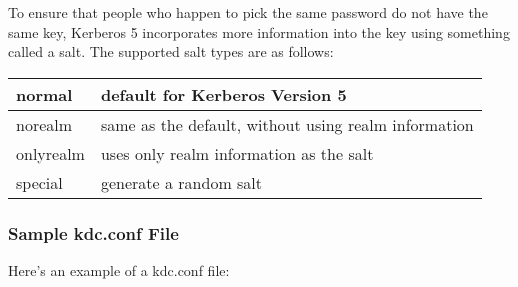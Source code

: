\documentclass[letterpaper,10pt,english]{sphinxmanual}
\begin{document}
To ensure that people who happen to pick the same password do not have
the same key, Kerberos 5 incorporates more information into the key
using something called a salt.  The supported salt types are as
follows:


\begin{savenotes}\sphinxattablestart
\centering
\begin{tabulary}{\linewidth}[t]{|T|T|}
\hline

normal
&
default for Kerberos Version 5
\\
\hline
norealm
&
same as the default, without using realm information
\\
\hline
onlyrealm
&
uses only realm information as the salt
\\
\hline
special
&
generate a random salt
\\
\hline
\end{tabulary}
\par
\sphinxattableend\end{savenotes}


\subsubsection{Sample kdc.conf File}
\label{\detokenize{admin/conf_files/kdc_conf:sample-kdc-conf-file}}
Here’s an example of a kdc.conf file:
\end{document}
